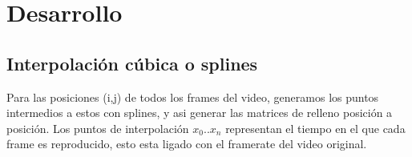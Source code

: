 \section{Desarrollo}

\subsection{Interpolación cúbica o splines}

Para las posiciones (i,j) de todos los frames del video, generamos los puntos intermedios a estos con splines, y asi generar las matrices de relleno posición a posición. Los puntos de interpolación $x_{0} .. x_{n}$ representan el tiempo en el que cada frame es reproducido, esto esta ligado con el framerate del video original.

